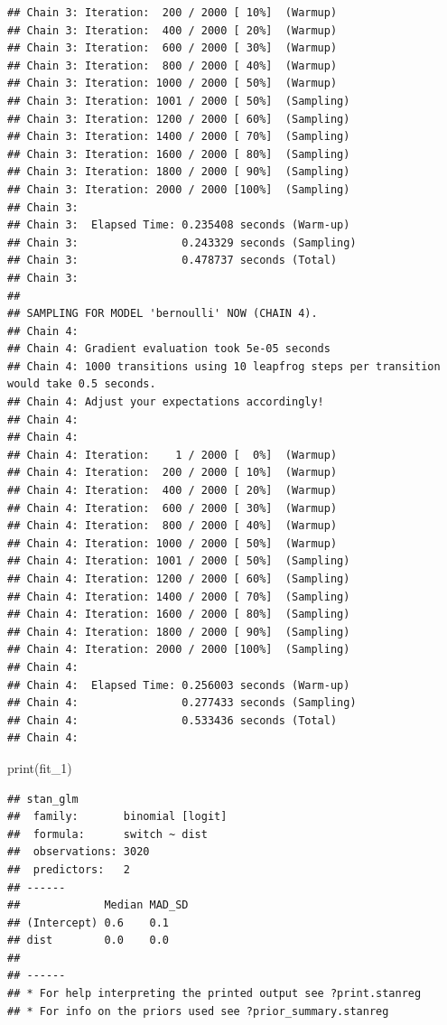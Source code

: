 \documentclass[
]{article}
\newenvironment{Shaded}{\begin{snugshade}}{\end{snugshade}}
\newcommand{\FunctionTok}[1]{\textcolor[rgb]{0.00,0.00,0.00}{#1}}
\newcommand{\NormalTok}[1]{#1}
\begin{document}
\begin{verbatim}
## Chain 3: Iteration:  200 / 2000 [ 10%]  (Warmup)
## Chain 3: Iteration:  400 / 2000 [ 20%]  (Warmup)
## Chain 3: Iteration:  600 / 2000 [ 30%]  (Warmup)
## Chain 3: Iteration:  800 / 2000 [ 40%]  (Warmup)
## Chain 3: Iteration: 1000 / 2000 [ 50%]  (Warmup)
## Chain 3: Iteration: 1001 / 2000 [ 50%]  (Sampling)
## Chain 3: Iteration: 1200 / 2000 [ 60%]  (Sampling)
## Chain 3: Iteration: 1400 / 2000 [ 70%]  (Sampling)
## Chain 3: Iteration: 1600 / 2000 [ 80%]  (Sampling)
## Chain 3: Iteration: 1800 / 2000 [ 90%]  (Sampling)
## Chain 3: Iteration: 2000 / 2000 [100%]  (Sampling)
## Chain 3: 
## Chain 3:  Elapsed Time: 0.235408 seconds (Warm-up)
## Chain 3:                0.243329 seconds (Sampling)
## Chain 3:                0.478737 seconds (Total)
## Chain 3: 
## 
## SAMPLING FOR MODEL 'bernoulli' NOW (CHAIN 4).
## Chain 4: 
## Chain 4: Gradient evaluation took 5e-05 seconds
## Chain 4: 1000 transitions using 10 leapfrog steps per transition would take 0.5 seconds.
## Chain 4: Adjust your expectations accordingly!
## Chain 4: 
## Chain 4: 
## Chain 4: Iteration:    1 / 2000 [  0%]  (Warmup)
## Chain 4: Iteration:  200 / 2000 [ 10%]  (Warmup)
## Chain 4: Iteration:  400 / 2000 [ 20%]  (Warmup)
## Chain 4: Iteration:  600 / 2000 [ 30%]  (Warmup)
## Chain 4: Iteration:  800 / 2000 [ 40%]  (Warmup)
## Chain 4: Iteration: 1000 / 2000 [ 50%]  (Warmup)
## Chain 4: Iteration: 1001 / 2000 [ 50%]  (Sampling)
## Chain 4: Iteration: 1200 / 2000 [ 60%]  (Sampling)
## Chain 4: Iteration: 1400 / 2000 [ 70%]  (Sampling)
## Chain 4: Iteration: 1600 / 2000 [ 80%]  (Sampling)
## Chain 4: Iteration: 1800 / 2000 [ 90%]  (Sampling)
## Chain 4: Iteration: 2000 / 2000 [100%]  (Sampling)
## Chain 4: 
## Chain 4:  Elapsed Time: 0.256003 seconds (Warm-up)
## Chain 4:                0.277433 seconds (Sampling)
## Chain 4:                0.533436 seconds (Total)
## Chain 4:
\end{verbatim}

\begin{Shaded}
\begin{Highlighting}[]
\FunctionTok{print}\NormalTok{(fit\_1)}
\end{Highlighting}
\end{Shaded}

\begin{verbatim}
## stan_glm
##  family:       binomial [logit]
##  formula:      switch ~ dist
##  observations: 3020
##  predictors:   2
## ------
##             Median MAD_SD
## (Intercept) 0.6    0.1   
## dist        0.0    0.0   
## 
## ------
## * For help interpreting the printed output see ?print.stanreg
## * For info on the priors used see ?prior_summary.stanreg
\end{verbatim}
\end{document}
